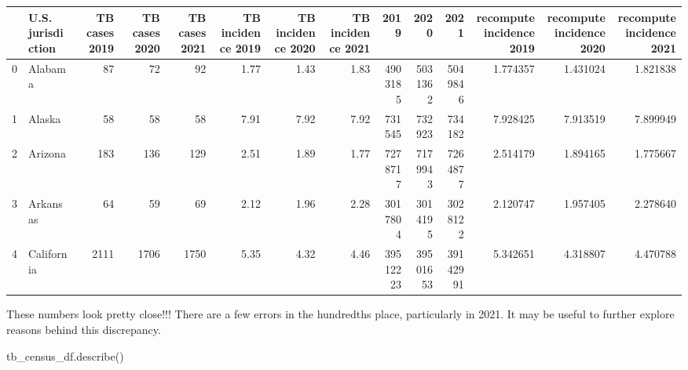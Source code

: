 \documentclass[
  letterpaper,
  DIV=11,
  numbers=noendperiod]{scrreprt}
\newenvironment{Shaded}{\begin{snugshade}}{\end{snugshade}}
\newcommand{\NormalTok}[1]{\textcolor[rgb]{0.00,0.23,0.31}{#1}}
\begin{document}
\begin{tabular}{llrrrrrrrrrrrr}
\toprule
{} & U.S. jurisdiction &  TB cases 2019 &  TB cases 2020 &  TB cases 2021 &  TB incidence 2019 &  TB incidence 2020 &  TB incidence 2021 &      2019 &      2020 &      2021 &  recompute incidence 2019 &  recompute incidence 2020 &  recompute incidence 2021 \\
\midrule
0 &           Alabama &             87 &             72 &             92 &               1.77 &               1.43 &               1.83 &   4903185 &   5031362 &   5049846 &                  1.774357 &                  1.431024 &                  1.821838 \\
1 &            Alaska &             58 &             58 &             58 &               7.91 &               7.92 &               7.92 &    731545 &    732923 &    734182 &                  7.928425 &                  7.913519 &                  7.899949 \\
2 &           Arizona &            183 &            136 &            129 &               2.51 &               1.89 &               1.77 &   7278717 &   7179943 &   7264877 &                  2.514179 &                  1.894165 &                  1.775667 \\
3 &          Arkansas &             64 &             59 &             69 &               2.12 &               1.96 &               2.28 &   3017804 &   3014195 &   3028122 &                  2.120747 &                  1.957405 &                  2.278640 \\
4 &        California &           2111 &           1706 &           1750 &               5.35 &               4.32 &               4.46 &  39512223 &  39501653 &  39142991 &                  5.342651 &                  4.318807 &                  4.470788 \\
\bottomrule
\end{tabular}

These numbers look pretty close!!! There are a few errors in the
hundredths place, particularly in 2021. It may be useful to further
explore reasons behind this discrepancy.

\begin{Shaded}
\begin{Highlighting}[]
\NormalTok{tb\_census\_df.describe()}
\end{Highlighting}
\end{Shaded}
\end{document}
